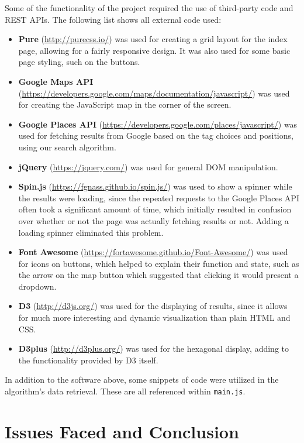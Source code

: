 \documentclass[10pt,a4paper]{article}
\begin{document}
Some of the functionality of the project required the use of third-party code and REST APIs. The following list shows all external code used:

\begin{itemize}
	\item \textbf{Pure} (\url{http://purecss.io/}) was used for creating a grid layout for the index page, allowing for a fairly responsive design. It was also used for some basic page styling, such on the buttons.
	\item \textbf{Google Maps API} (\url{https://developers.google.com/maps/documentation/javascript/}) was used for creating the JavaScript map in the corner of the screen.
	\item \textbf{Google Places API} (\url{https://developers.google.com/places/javascript/}) was used for fetching results from Google based on the tag choices and positions, using our search algorithm.
	\item \textbf{jQuery} (\url{https://jquery.com/}) was used for general DOM manipulation.
	\item \textbf{Spin.js} (\url{https://fgnass.github.io/spin.js/}) was used to show a spinner while the results were loading, since the repeated requests to the Google Places API often took a significant amount of time, which initially resulted in confusion over whether or not the page was actually fetching results or not. Adding a loading spinner eliminated this problem.
	\item \textbf{Font Awesome} (\url{https://fortawesome.github.io/Font-Awesome/}) was used for icons on buttons, which helped to explain their function and state, such as the arrow on the map button which suggested that clicking it would present a dropdown.
	\item \textbf{D3} (\url{http://d3js.org/}) was used for the displaying of results, since it allows for much more interesting and dynamic visualization than plain HTML and CSS.
	\item \textbf{D3plus} (\url{http://d3plus.org/}) was used for the hexagonal display, adding to the functionality provided by D3 itself.
\end{itemize}

In addition to the software above, some snippets of code were utilized in the algorithm’s data retrieval. These are all referenced within {\tt main.js}.


\section*{Issues Faced and Conclusion}
\end{document}
